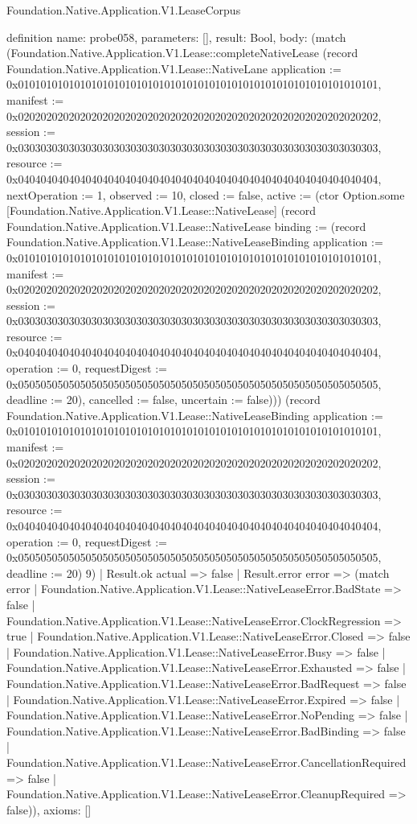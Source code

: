 \begin{lexlean}{Foundation.Native.Application.V1.LeaseCorpus}
\begin{semanticmodule}
definition{
  name: probe058,
  parameters: [],
  result: Bool,
  body: (match (Foundation.Native.Application.V1.Lease::completeNativeLease (record Foundation.Native.Application.V1.Lease::NativeLane {application := 0x0101010101010101010101010101010101010101010101010101010101010101, manifest := 0x0202020202020202020202020202020202020202020202020202020202020202, session := 0x0303030303030303030303030303030303030303030303030303030303030303, resource := 0x0404040404040404040404040404040404040404040404040404040404040404, nextOperation := 1, observed := 10, closed := false, active := (ctor Option.some [Foundation.Native.Application.V1.Lease::NativeLease] (record Foundation.Native.Application.V1.Lease::NativeLease {binding := (record Foundation.Native.Application.V1.Lease::NativeLeaseBinding {application := 0x0101010101010101010101010101010101010101010101010101010101010101, manifest := 0x0202020202020202020202020202020202020202020202020202020202020202, session := 0x0303030303030303030303030303030303030303030303030303030303030303, resource := 0x0404040404040404040404040404040404040404040404040404040404040404, operation := 0, requestDigest := 0x0505050505050505050505050505050505050505050505050505050505050505, deadline := 20}), cancelled := false, uncertain := false}))}) (record Foundation.Native.Application.V1.Lease::NativeLeaseBinding {application := 0x0101010101010101010101010101010101010101010101010101010101010101, manifest := 0x0202020202020202020202020202020202020202020202020202020202020202, session := 0x0303030303030303030303030303030303030303030303030303030303030303, resource := 0x0404040404040404040404040404040404040404040404040404040404040404, operation := 0, requestDigest := 0x0505050505050505050505050505050505050505050505050505050505050505, deadline := 20}) 9)
    | Result.ok actual => false
    | Result.error error => (match error
      | Foundation.Native.Application.V1.Lease::NativeLeaseError.BadState => false
      | Foundation.Native.Application.V1.Lease::NativeLeaseError.ClockRegression => true
      | Foundation.Native.Application.V1.Lease::NativeLeaseError.Closed => false
      | Foundation.Native.Application.V1.Lease::NativeLeaseError.Busy => false
      | Foundation.Native.Application.V1.Lease::NativeLeaseError.Exhausted => false
      | Foundation.Native.Application.V1.Lease::NativeLeaseError.BadRequest => false
      | Foundation.Native.Application.V1.Lease::NativeLeaseError.Expired => false
      | Foundation.Native.Application.V1.Lease::NativeLeaseError.NoPending => false
      | Foundation.Native.Application.V1.Lease::NativeLeaseError.BadBinding => false
      | Foundation.Native.Application.V1.Lease::NativeLeaseError.CancellationRequired => false
      | Foundation.Native.Application.V1.Lease::NativeLeaseError.CleanupRequired => false)),
  axioms: []
}


\end{semanticmodule}
\end{lexlean}
